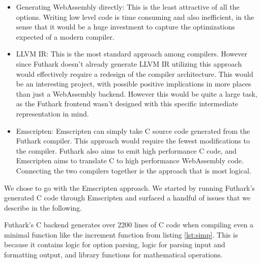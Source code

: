 \documentclass[11pt]{book}
\begin{document}


\begin{itemize}
    \item Generating WebAssembly directly: 
        This is the least attractive of all the options. Writing low level code is time consuming and also inefficient, in the sense that it would be a huge investment to capture the optimizations expected of a modern compiler.
    \item LLVM IR: This is the most standard approach among compilers. However since Futhark doesn't already generate LLVM IR utilizing this approach would effectively require a redesign of the compiler architecture. This would be an interesting project, with possible positive implications in more places than just a WebAssembly backend. However this would be quite a large task, as the Futhark frontend wasn't designed with this specific intermediate representation in mind. 
    \item Emscripten: Emscripten can simply take C source code generated from the Futhark compiler. This approach would require the fewest modifications to the compiler. Futhark also aims to emit high performance C code, and Emscripten aims to translate C to high performance WebAssembly code. Connecting the two compilers together is the approach that is most logical.%
\end{itemize}

We chose to go with the Emscripten approach. We started by running Futhark's generated C code through Emscripten and surfaced a handful of issues that we describe in the following. 



Futhark's C backend generates over 2200 lines of C code when compiling even a minimal function like the increment function from listing \ref{lst:simp}. This is because it contains logic for option parsing, logic for parsing input and formatting output, and library functions for mathematical operations.
\end{document}
